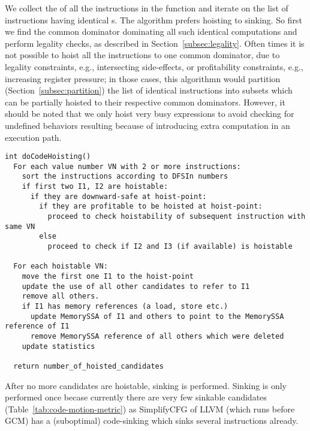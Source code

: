 \documentclass[acmlarge,review,anonymous]{acmart}\settopmatter{printfolios=true}
\begin{document}
We collect the \GVN{} of all the instructions in the function and iterate on the
list of instructions having identical \GVN{}s. The algorithm prefers hoisting to
sinking. So first we find the common dominator dominating all such identical
computations and perform legality checks, as described in
Section~\ref{subsec:legality}. Often times it is not possible to hoist all the
instructions to one common dominator, due to legality constraints, e.g.,
intersecting side-effects, or profitability constraints, e.g., increasing
register pressure; in those cases, this algorithmn would partition
(Section~\ref{subsec:partition}) the list of identical instructions into subsets
which can be partially hoisted to their respective common dominators. However,
it should be noted that we only hoist very busy expressions to avoid checking
for undefined behaviors resulting because of introducing extra computation in an
execution path.

\begin{verbatim}
int doCodeHoisting()
  For each value number VN with 2 or more instructions:
    sort the instructions according to DFSIn numbers
    if first two I1, I2 are hoistable:
      if they are downward-safe at hoist-point:
        if they are profitable to be hoisted at hoist-point:
          proceed to check hoistability of subsequent instruction with same VN
        else
          proceed to check if I2 and I3 (if available) is hoistable

  For each hoistable VN:
    move the first one I1 to the hoist-point
    update the use of all other candidates to refer to I1
    remove all others.
    if I1 has memory references (a load, store etc.)
      update MemorySSA of I1 and others to point to the MemorySSA reference of I1
      remove MemorySSA reference of all others which were deleted
    update statistics

  return number_of_hoisted_candidates
\end{verbatim}

After no more candidates are hoistable, sinking is performed. Sinking is only
performed once becase currently there are very few sinkable candidates
(Table~\ref{tab:code-motion-metric}) as SimplifyCFG of LLVM (which runs before
GCM) has a (suboptimal) code-sinking which sinks several instructions already.
\end{document}
